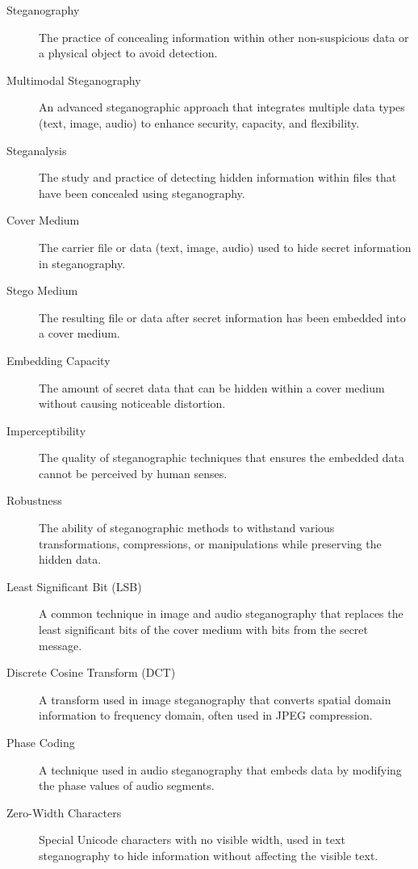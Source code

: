 \documentclass[12pt, a4paper, oneside]{book}
\begin{document}
\begin{description}
    \item[Steganography] The practice of concealing information within other non-suspicious data or a physical object to avoid detection.

    \item[Multimodal Steganography] An advanced steganographic approach that integrates multiple data types (text, image, audio) to enhance security, capacity, and flexibility.

    \item[Steganalysis] The study and practice of detecting hidden information within files that have been concealed using steganography.

    \item[Cover Medium] The carrier file or data (text, image, audio) used to hide secret information in steganography.

    \item[Stego Medium] The resulting file or data after secret information has been embedded into a cover medium.

    \item[Embedding Capacity] The amount of secret data that can be hidden within a cover medium without causing noticeable distortion.

    \item[Imperceptibility] The quality of steganographic techniques that ensures the embedded data cannot be perceived by human senses.

    \item[Robustness] The ability of steganographic methods to withstand various transformations, compressions, or manipulations while preserving the hidden data.

    \item[Least Significant Bit (LSB)] A common technique in image and audio steganography that replaces the least significant bits of the cover medium with bits from the secret message.

    \item[Discrete Cosine Transform (DCT)] A transform used in image steganography that converts spatial domain information to frequency domain, often used in JPEG compression.

    \item[Phase Coding] A technique used in audio steganography that embeds data by modifying the phase values of audio segments.

    \item[Zero-Width Characters] Special Unicode characters with no visible width, used in text steganography to hide information without affecting the visible text.


\end{description}
\end{document}
